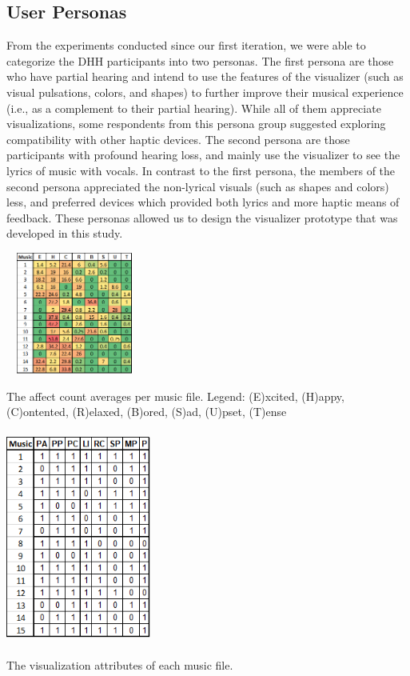 \documentclass{sigchi-ext}
\begin{document}
\subsection{User Personas}
From the experiments conducted since our first iteration, we were able to categorize the DHH participants into two personas. The first persona are those who have partial hearing and intend to use the features of the visualizer (such as visual pulsations, colors, and shapes) to further improve their musical experience (i.e., as a complement to their partial hearing). While all of them appreciate visualizations, some respondents from this persona group suggested exploring compatibility with other haptic devices. The second persona are those participants with profound hearing loss, and mainly use the visualizer to see the lyrics of music with vocals. In contrast to the first persona, the members of the second persona appreciated the non-lyrical visuals (such as shapes and colors) less, and preferred devices which provided both lyrics and more haptic means of feedback. These personas allowed us to design the visualizer prototype that was developed in this study.


\begin{marginfigure}[-35pc]
\begin{minipage}{\marginparwidth}
     \includegraphics[width=4.5cm,height=4cm]{figures/Affects.png}
    \caption{The affect count averages per music file. Legend: (E)xcited, (H)appy, (C)ontented, (R)elaxed, (B)ored, (S)ad, (U)pset, (T)ense}
    \label{fig:affects}
    \end{minipage}
\end{marginfigure}

\begin{marginfigure}[-10pc]
\begin{minipage}{\marginparwidth}
     \includegraphics[width=4.75cm,height=7cm]{figures/Visualizations.png}
    \caption{The visualization attributes of each music file.}
    \label{fig:visualizations}
    \end{minipage}
\end{marginfigure}
\end{document}
